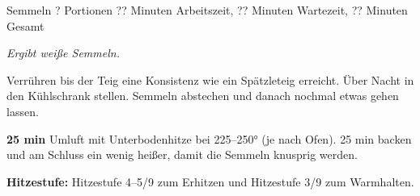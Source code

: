 \begin{recipe}{Semmeln} {? Portionen} {?? Minuten Arbeitszeit, ?? Minuten Wartezeit, ?? Minuten Gesamt}

  \freeform{}\textit{Ergibt weiße Semmeln.}


  Verrühren bis der Teig eine Konsistenz wie ein Spätzleteig erreicht.
  Über Nacht in den Kühlschrank stellen.
  Semmeln abstechen und danach nochmal etwas gehen lassen.

  \newstep{}\textbf{25 min}
  Umluft mit Unterbodenhitze bei 225–250° (je nach Ofen).
  25 min backen und am Schluss ein wenig heißer, damit die Semmeln knusprig werden.

  \freeform{}\hrulefill{}

  \freeform{}\textbf{Hitzestufe:}
  Hitzestufe 4–5/9 zum Erhitzen und Hitzestufe 3/9 zum Warmhalten.

\end{recipe}
